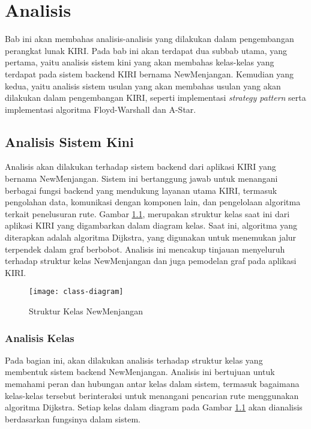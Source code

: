 \chapter{Analisis}
\label{chap:analisis}
Bab ini akan membahas analisis-analisis yang dilakukan dalam pengembangan perangkat lunak KIRI. Pada bab ini akan terdapat dua subbab utama, yang pertama, yaitu analisis sistem kini yang akan membahas kelas-kelas yang terdapat pada sistem backend KIRI bernama NewMenjangan. Kemudian yang kedua, yaitu analisis sistem usulan yang akan membahas usulan yang akan dilakukan dalam pengembangan KIRI, seperti implementasi \textit{strategy pattern} serta implementasi algoritma Floyd-Warshall dan A-Star.
\section{Analisis Sistem Kini}
\label{sec:sistemkini}
Analisis akan dilakukan terhadap sistem backend dari aplikasi KIRI yang bernama NewMenjangan. Sistem ini bertanggung jawab untuk menangani berbagai fungsi backend yang mendukung layanan utama KIRI, termasuk pengolahan data, komunikasi dengan komponen lain, dan pengelolaan algoritma terkait penelusuran rute. Gambar \ref{fig:strukturkelas}, merupakan struktur kelas saat ini dari aplikasi KIRI yang digambarkan dalam diagram kelas. Saat ini, algoritma yang diterapkan adalah algoritma Dijkstra, yang digunakan untuk menemukan jalur terpendek dalam graf berbobot. Analisis ini mencakup tinjauan menyeluruh terhadap struktur kelas NewMenjangan dan juga pemodelan graf pada aplikasi KIRI.
\begin{figure}[h] 
    \centering  
    \texttt{[image: class-diagram]}  
    \caption{Struktur Kelas NewMenjangan}
    \label{fig:strukturkelas} 
\end{figure}
\newpage
\subsection{Analisis Kelas}
Pada bagian ini, akan dilakukan analisis terhadap struktur kelas yang membentuk sistem backend NewMenjangan. Analisis ini bertujuan untuk memahami peran dan hubungan antar kelas dalam sistem, termasuk bagaimana kelas-kelas tersebut berinteraksi untuk menangani pencarian rute menggunakan algoritma Dijkstra. Setiap kelas dalam diagram pada Gambar \ref{fig:strukturkelas} akan dianalisis berdasarkan fungsinya dalam sistem.

